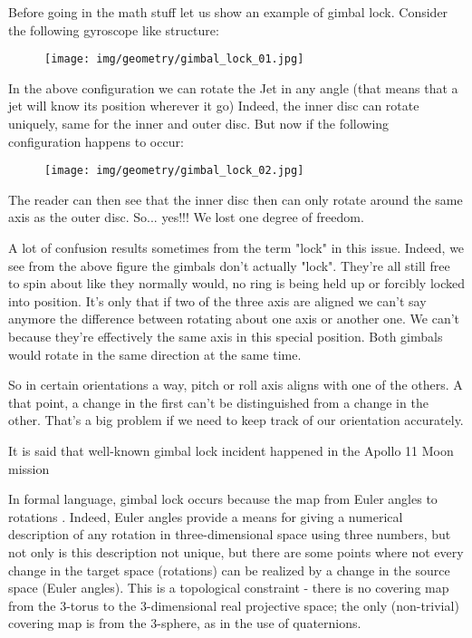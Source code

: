 	Before going in the math stuff let us show an example of gimbal lock. Consider the following gyroscope like structure:
	\begin{figure}[H]
		\centering
		\texttt{[image: img/geometry/gimbal\_lock\_01.jpg]}
	\end{figure}
	In the above configuration we can rotate the Jet in any angle (that means that a jet will know its position wherever it go) Indeed, the inner disc can rotate uniquely, same for the inner and outer disc. But now if the following configuration happens to occur:
	\begin{figure}[H]
		\centering
		\texttt{[image: img/geometry/gimbal\_lock\_02.jpg]}
	\end{figure}
	The reader can then see that the inner disc then can only rotate around the same axis as the outer disc. So... yes!!! We lost one degree of freedom.
	
	A lot of confusion results sometimes from the term "lock" in this issue. Indeed, we see from the above figure the gimbals don't actually "lock". They're all still free to spin about like they normally would, no ring is being held up or forcibly locked into position. It's only that if two of the three axis are aligned we can't say anymore  the difference between rotating about one axis or another one. We can't because they're effectively the same axis in this special position. Both gimbals would rotate in the same direction at the same time.

	So in certain orientations a way, pitch or roll axis aligns with one of the others. A that point, a change in the first can't be distinguished from a change in the other. That's a big problem if we need to keep track of our orientation accurately. 
	
	\begin{tcolorbox}[title=Remark,colframe=black,arc=10pt]
	It is said that well-known gimbal lock incident happened in the Apollo 11 Moon mission
	\end{tcolorbox}
	In formal language, gimbal lock occurs because the map from Euler angles to rotations . Indeed, Euler angles provide a means for giving a numerical description of any rotation in three-dimensional space using three numbers, but not only is this description not unique, but there are some points where not every change in the target space (rotations) can be realized by a change in the source space (Euler angles). This is a topological constraint - there is no covering map from the 3-torus to the 3-dimensional real projective space; the only (non-trivial) covering map is from the 3-sphere, as in the use of quaternions.

